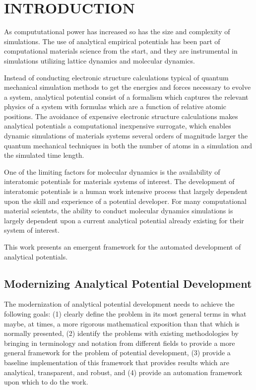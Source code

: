 \chapter{INTRODUCTION}\label{intro}

As compututational power has increased so has the size and complexity of simulations.  The use of analytical empirical potentials has been part of computational materials science from the start, and they are instrumental in simulations utilizing lattice dynamics and molecular dynamics.

Instead of conducting electronic structure calculations typical of quantum mechanical simulation methods to get the energies and forces necessary to evolve a system, analytical potential consist of a formalism which captures the relevant physics of a system with formulas which are a function of relative atomic positions.  The avoidance of expensive electronic structure calculations makes analytical potentials a computational inexpensive surrogate, which enables dynamic simulations of materials systems several orders of magnitude larger the quantum mechanical techniques in both the number of atoms in a simulation and the simulated time length.

One of the limiting factors for molecular dynamics is the availability of interatomic potentials for materials systems of interest.  The development of interatomic potentials is a human work intensive process that largely dependent upon the skill and experience of a potential developer.  For many computational material scientsts, the ability to conduct molecular dynamics simulations is largely dependent upon a current analytical potential already existing for their system of interest.

This work presents an emergent framework for the automated development of analytical potentials.

\section{Modernizing Analytical Potential Development}

The modernization of analytical potential development needs to achieve the following goals:
(1) clearly define the problem in its most general terms in what maybe, at times, a more rigorous mathematical exposition than that which is normally presented,
(2) identify the problems with existing methodologies by bringing in terminology and notation from different fields to provide a more general framework for the problem of potential development,
(3) provide a baseline implementation of this framework that provides results which are analytical, transparent, and robust, and
(4) provide an automation framework upon which to do the work.

